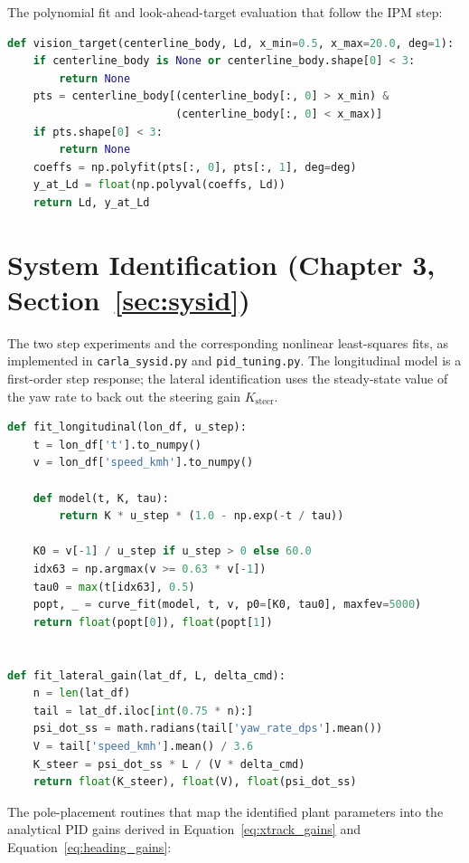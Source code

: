 The polynomial fit and look-ahead-target evaluation that follow the \acs{IPM} step:

\begin{lstlisting}[language=Python]
def vision_target(centerline_body, Ld, x_min=0.5, x_max=20.0, deg=1):
    if centerline_body is None or centerline_body.shape[0] < 3:
        return None
    pts = centerline_body[(centerline_body[:, 0] > x_min) &
                          (centerline_body[:, 0] < x_max)]
    if pts.shape[0] < 3:
        return None
    coeffs = np.polyfit(pts[:, 0], pts[:, 1], deg=deg)
    y_at_Ld = float(np.polyval(coeffs, Ld))
    return Ld, y_at_Ld
\end{lstlisting}

\section{System Identification (Chapter 3, Section~\ref{sec:sysid})}
The two step experiments and the corresponding nonlinear least-squares fits, as implemented in \texttt{carla\_sysid.py} and \texttt{pid\_tuning.py}. The longitudinal model is a first-order step response; the lateral identification uses the steady-state value of the yaw rate to back out the steering gain $K_{\mathrm{steer}}$.

\begin{lstlisting}[language=Python]
def fit_longitudinal(lon_df, u_step):
    t = lon_df['t'].to_numpy()
    v = lon_df['speed_kmh'].to_numpy()

    def model(t, K, tau):
        return K * u_step * (1.0 - np.exp(-t / tau))

    K0 = v[-1] / u_step if u_step > 0 else 60.0
    idx63 = np.argmax(v >= 0.63 * v[-1])
    tau0 = max(t[idx63], 0.5)
    popt, _ = curve_fit(model, t, v, p0=[K0, tau0], maxfev=5000)
    return float(popt[0]), float(popt[1])


def fit_lateral_gain(lat_df, L, delta_cmd):
    n = len(lat_df)
    tail = lat_df.iloc[int(0.75 * n):]
    psi_dot_ss = math.radians(tail['yaw_rate_dps'].mean())
    V = tail['speed_kmh'].mean() / 3.6
    K_steer = psi_dot_ss * L / (V * delta_cmd)
    return float(K_steer), float(V), float(psi_dot_ss)
\end{lstlisting}

The pole-placement routines that map the identified plant parameters into the analytical PID gains derived in Equation~\eqref{eq:xtrack_gains} and Equation~\eqref{eq:heading_gains}:

